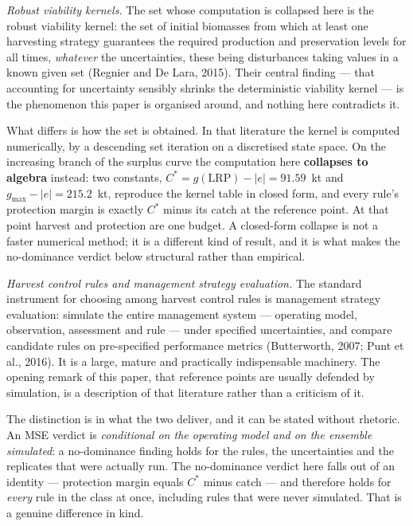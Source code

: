 \documentclass[11pt]{article}
\begin{document}
\textit{Robust viability kernels.} The set whose computation is collapsed here is the robust
viability kernel: the set of initial biomasses from which at least one harvesting strategy
guarantees the required production and preservation levels for all times, \emph{whatever} the
uncertainties, these being disturbances taking values in a known given set (Regnier and De
Lara, 2015). Their central finding --- that accounting for uncertainty sensibly shrinks the
deterministic viability kernel --- is the phenomenon this paper is organised around, and
nothing here contradicts it.

What differs is how the set is obtained. In that literature the kernel is computed
numerically, by a descending set iteration on a discretised state space. On the increasing
branch of the surplus curve the computation here \textbf{collapses to algebra} instead: two
constants, $C^{*} = g(\mathrm{LRP}) - |e| = 91.59$~kt and $g_{\max} - |e| = 215.2$~kt,
reproduce the kernel table in closed form, and every rule's protection margin is exactly
$C^{*}$ minus its catch at the reference point. At that point harvest and protection are one
budget. A closed-form collapse is not a faster numerical method; it is a different kind of
result, and it is what makes the no-dominance verdict below structural rather than empirical.

\textit{Harvest control rules and management strategy evaluation.} The standard instrument for
choosing among harvest control rules is management strategy evaluation: simulate the entire
management system --- operating model, observation, assessment and rule --- under specified
uncertainties, and compare candidate rules on pre-specified performance metrics (Butterworth,
2007; Punt et al., 2016). It is a large, mature and practically indispensable machinery. The
opening remark of this paper, that reference points are usually defended by simulation, is a
description of that literature rather than a criticism of it.

The distinction is in what the two deliver, and it can be stated without rhetoric. An MSE
verdict is \emph{conditional on the operating model and on the ensemble simulated}: a
no-dominance finding holds for the rules, the uncertainties and the replicates that were
actually run. The no-dominance verdict here falls out of an identity --- protection margin
equals $C^{*}$ minus catch --- and therefore holds for \emph{every} rule in the class at
once, including rules that were never simulated. That is a genuine difference in kind.
\end{document}
